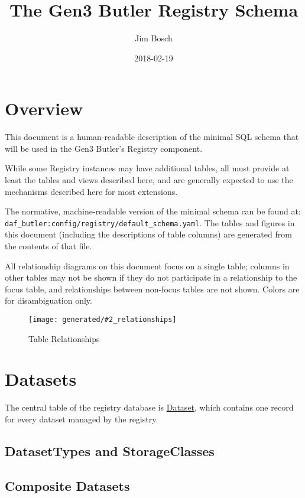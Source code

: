 \documentclass[DM,toc]{lsstdoc}
\title{The Gen3 Butler Registry Schema}
\author{Jim Bosch}
\date{2018-02-19}
\newcommand{\tblref}[1]{\hyperref[tbl:#1]{#1}}
\newcommand{\coltable}[1]{
    \begin{table}
        {\footnotesize
        }
        \caption{#1 Columns}
        \label{tbl:#1}
    \end{table}
}
\newcommand{\relgraph}[3][width=0.8\textwidth]{
    \begin{figure}
        \centering
        \texttt{[image: generated/\#2\_relationships]}
        \caption{#3}
        \label{rel:#2}
    \end{figure}
}
\begin{document}
\maketitle

\section{Overview}
\label{sec:overview}

This document is a human-readable description of the minimal SQL schema that will be used in the Gen3 Butler's Registry component.

While some Registry instances may have additional tables, all must provide at least the tables and views described here, and are generally expected to use the mechanisms described here for most extensions.

The normative, machine-readable version of the minimal schema can be found at: \verb`daf_butler:config/registry/default_schema.yaml`.
The tables and figures in this document (including the descriptions of table columns) are generated from the contents of that file.

All relationship diagrams on this document focus on a single table; columns in other tables may not be shown if they do not participate in a relationship to the focus table, and relationships between non-focus tables are not shown.  Colors are for disambiguation only.

\relgraph[width=\textwidth]{All}{Table Relationships}

\section{Datasets}
\label{sec:datasets}

The central table of the registry database is \tblref{Dataset}, which contains one record for every dataset managed by the registry.

\coltable{Dataset}


\subsection{DatasetTypes and StorageClasses}
\label{sec:datasettypes-and-storageclasses}

\coltable{DatasetType}

\coltable{DatasetTypeUnits}
\coltable{DatasetTypeMetadata}

\subsection{Composite Datasets}
\label{sec:composite-datasets}
\end{document}
